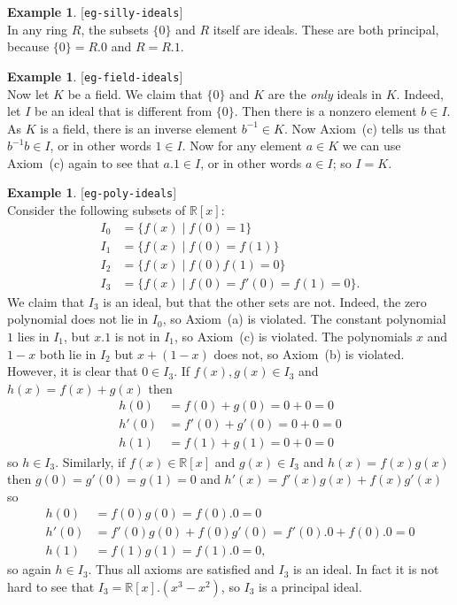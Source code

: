 \documentclass{amsart}
\newcommand{\lbl}[1]{\label{#1}\textup{[\texttt{#1}]}\ \\}
\newcommand{\lbl}{\label}
\newcommand{\R}         {{\mathbb{R}}}
\newcommand{\st}        {\;|\;}
\renewcommand{\:}{\colon}
\theoremstyle{definition}
\newtheorem{example}[theorem]{Example}
\begin{document}
\begin{example}\lbl{eg-silly-ideals}
 In any ring $R$, the subsets $\{0\}$ and $R$ itself are ideals.
 These are both principal, because $\{0\}=R.0$ and $R=R.1$.
\end{example}
\begin{example}\lbl{eg-field-ideals}
 Now let $K$ be a field.  We claim that $\{0\}$ and $K$ are the
 \emph{only} ideals in $K$.  Indeed, let $I$ be an ideal that is
 different from $\{0\}$.  Then there is a nonzero element $b\in I$.
 As $K$ is a field, there is an inverse element $b^{-1}\in K$.  Now
 Axiom~(c) tells us that $b^{-1}b\in I$, or in other words $1\in I$.
 Now for any element $a\in K$ we can use Axiom~(c) again to see that
 $a.1\in I$, or in other words $a\in I$; so $I=K$.
\end{example}
\begin{example}\lbl{eg-poly-ideals}
 Consider the following subsets of $\R[x]$:
 \begin{align*}
  I_0 &= \{f(x)\st f(0)=1\} \\
  I_1 &= \{f(x)\st f(0)=f(1)\} \\
  I_2 &= \{f(x)\st f(0)f(1)=0\} \\
  I_3 &= \{f(x)\st f(0)=f'(0)=f(1)=0\}.
 \end{align*}
 We claim that $I_3$ is an ideal, but that the other sets are not.
 Indeed, the zero polynomial does not lie in $I_0$, so Axiom~(a) is
 violated.  The constant polynomial $1$ lies in $I_1$, but $x.1$ is
 not in $I_1$, so Axiom~(c) is violated.  The polynomials $x$ and
 $1-x$ both lie in $I_2$ but $x+(1-x)$ does not, so Axiom~(b) is
 violated.  However, it is clear that $0\in I_3$.  If
 $f(x),g(x)\in I_3$ and $h(x)=f(x)+g(x)$ then 
 \begin{align*}
  h(0)  &= f(0)+g(0) = 0+0 = 0 \\
  h'(0) &= f'(0)+g'(0) = 0+0 = 0 \\
  h(1)  &= f(1)+g(1) = 0+0 = 0 
 \end{align*}
 so $h\in I_3$.  Similarly, if $f(x)\in\R[x]$ and $g(x)\in I_3$ and
 $h(x)=f(x)g(x)$ then $g(0)=g'(0)=g(1)=0$ and
 $h'(x)=f'(x)g(x)+f(x)g'(x)$ so
 \begin{align*}
  h(0)  &= f(0)g(0) = f(0).0 = 0 \\
  h'(0) &= f'(0)g(0)+f(0)g'(0) = f'(0).0+f(0).0 = 0 \\
  h(1)  &= f(1)g(1) = f(1).0 = 0, 
 \end{align*}
 so again $h\in I_3$.  Thus all axioms are satisfied and $I_3$ is an
 ideal.  In fact it is not hard to see that $I_3=\R[x].(x^3-x^2)$, so
 $I_3$ is a principal ideal.
\end{example}
\end{document}
